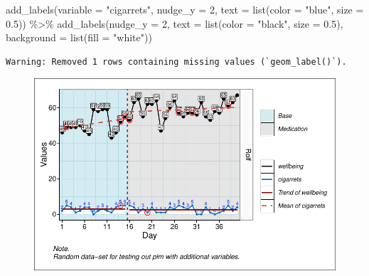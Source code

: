 \documentclass[
  letterpaper,
  DIV=11,
  numbers=noendperiod]{scrreprt}
\newenvironment{Shaded}{\begin{snugshade}}{\end{snugshade}}
\newcommand{\AttributeTok}[1]{\textcolor[rgb]{0.40,0.45,0.13}{#1}}
\newcommand{\DecValTok}[1]{\textcolor[rgb]{0.68,0.00,0.00}{#1}}
\newcommand{\FloatTok}[1]{\textcolor[rgb]{0.68,0.00,0.00}{#1}}
\newcommand{\FunctionTok}[1]{\textcolor[rgb]{0.28,0.35,0.67}{#1}}
\newcommand{\NormalTok}[1]{\textcolor[rgb]{0.00,0.23,0.31}{#1}}
\newcommand{\SpecialCharTok}[1]{\textcolor[rgb]{0.37,0.37,0.37}{#1}}
\newcommand{\StringTok}[1]{\textcolor[rgb]{0.13,0.47,0.30}{#1}}
\begin{document}
\begin{Shaded}
\begin{Highlighting}[]
  \FunctionTok{add\_labels}\NormalTok{(}\AttributeTok{variable =} \StringTok{"cigarrets"}\NormalTok{, }\AttributeTok{nudge\_y =} \DecValTok{2}\NormalTok{, }
             \AttributeTok{text =} \FunctionTok{list}\NormalTok{(}\AttributeTok{color =} \StringTok{"blue"}\NormalTok{, }\AttributeTok{size =} \FloatTok{0.5}\NormalTok{)) }\SpecialCharTok{\%\textgreater{}\%}
  \FunctionTok{add\_labels}\NormalTok{(}\AttributeTok{nudge\_y =} \DecValTok{2}\NormalTok{, }\AttributeTok{text =} \FunctionTok{list}\NormalTok{(}\AttributeTok{color =} \StringTok{"black"}\NormalTok{, }\AttributeTok{size =} \FloatTok{0.5}\NormalTok{),}
             \AttributeTok{background =} \FunctionTok{list}\NormalTok{(}\AttributeTok{fill =} \StringTok{"white"}\NormalTok{))}
\end{Highlighting}
\end{Shaded}

\begin{verbatim}
Warning: Removed 1 rows containing missing values (`geom_label()`).
\end{verbatim}

\begin{figure}[H]

{\centering \includegraphics{./ch_scplot_files/figure-pdf/complex2-1.pdf}

}

\end{figure}
\end{document}
